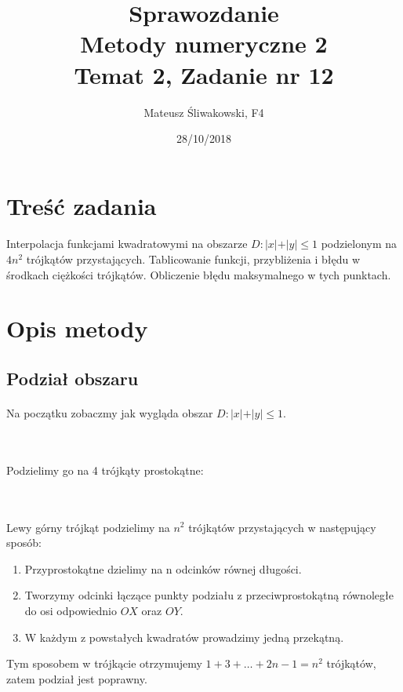 \documentclass{article}
\title{Sprawozdanie \\Metody numeryczne 2 \\\textbf{Temat 2, Zadanie nr 12}}
\date{28/10/2018}
\author{Mateusz Śliwakowski, F4}
\begin{document}
  \maketitle
	  \newpage

\section{Treść zadania}
\paragraph{}
Interpolacja funkcjami kwadratowymi na obszarze $D: \vert x \vert + \vert y \vert \leq 1$ podzielonym na $4n^2$ trójkątów przystających. Tablicowanie funkcji, przybliżenia i błędu w środkach ciężkości trójkątów. Obliczenie błędu maksymalnego w tych punktach.
\section{Opis metody}
\subsection{Podział obszaru}
\paragraph{}
Na początku zobaczmy jak wygląda obszar $D: \vert x \vert + \vert y \vert \leq 1$.\\\\
\\
Podzielimy go na 4 trójkąty prostokątne:\\\\
\\
Lewy górny trójkąt podzielimy na $n^2$ trójkątów przystających w następujący sposób:
\begin{enumerate}
\item Przyprostokątne dzielimy na n odcinków równej długości.
\item Tworzymy odcinki łączące punkty podziału z przeciwprostokątną równoległe do osi odpowiednio $OX$ oraz $OY$.
\item W każdym z powstałych kwadratów prowadzimy jedną przekątną.
\end{enumerate}
Tym sposobem w trójkącie otrzymujemy $1 + 3 + \dots + 2n-1 = n^2$ trójkątów, zatem podział jest poprawny.
\end{document}
